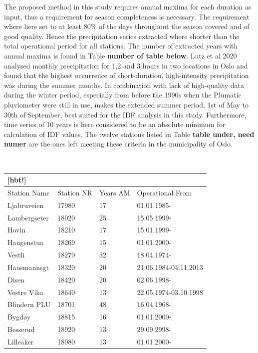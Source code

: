 The proposed method in this study requires annual maxima for each duration as input, thus a requirement for season completeness is necessary. The requirement where here set to at least 80\% of the days throughout the season covered and of good quality. Hence the precipitation series extracted where shorter than the total operational period for all stations. The number of extracted years with annual maxima is found in Table \textbf{number of table below}. Lutz et al 2020 analysed monthly precipitation for 1,2 and 3 hours in two locations in Oslo and found that the highest occurrence of short-duration, high-intensity precipitation was during the summer months. In combination with lack of high-quality data during the winter period, especially from before the 1990s when the Plumatic pluviometer were still in use, makes the extended summer period, 1st of May to 30th of September, best suited for the IDF analysis in this study. Furthermore, time series of 10 years is here considered to be an absolute minimum for calculation of IDF values. The twelve stations listed in Table \textbf{table under, need numer} are the ones left meeting these criteria in the municipality of Oslo.   

\\

\begin{center}
\begin{tabular}{ |p{3cm}||p{3cm}|p{3cm}|p{3cm}|  }[hbt!]
\hline
\multicolumn{4}{|c|}{Oslo Stations} \\
\hline
 Station Name & Station NR & Years AM & Operational From\\
 Ljabruveien & 17980  & 17 &  01.01.1985-\\
 Lambergseter & 18020 & 25 & 15.05.1999-\\
 Hovin & 18210 & 17 & 15.01.1999-\\
 Haugenstua & 18269 & 15 & 01.01.2000-\\
 Vestli & 18270 & 32 & 18.04.1974-\\
 Hausmannsgt & 18320 & 20 & 21.06.1984-04.11.2013\\
 Disen & 18420 & 20 & 02.06.1998-\\
 Vestre Vika & 18640 & 13 & 22.05.1974-03.10.1998\\
 Blindern PLU & 18701 & 48 & 16.04.1968-\\
 Bygdøy & 18815 & 16 & 01.01.2000-\\
 Besserud & 18920 & 13 & 29.09.2998-\\
 Lilleaker & 18980 & 13 & 01.01.2000-   
\end{tabular}
\end{center}

